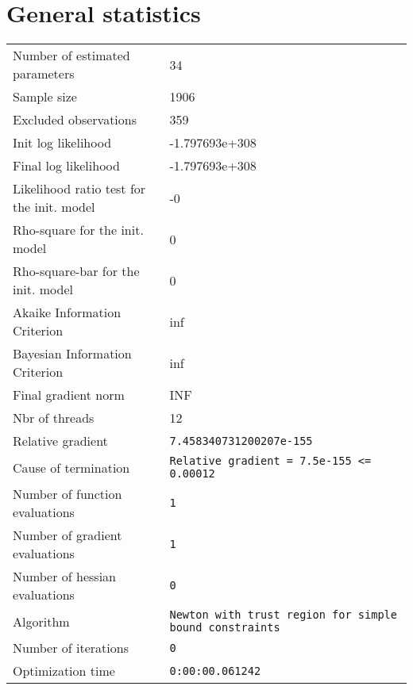



\section{General statistics}
\begin{tabular}{ll}
Number of estimated parameters & 34 \\
Sample size & 1906 \\
Excluded observations & 359 \\
Init log likelihood & -1.797693e+308 \\
Final log likelihood & -1.797693e+308 \\
Likelihood ratio test for the init. model & -0 \\
Rho-square for the init. model & 0 \\
Rho-square-bar for the init. model & 0 \\
Akaike Information Criterion & inf \\
Bayesian Information Criterion & inf \\
Final gradient norm & INF \\
Nbr of threads & 12 \\
Relative gradient & \verb$7.458340731200207e-155$ \\
Cause of termination & \verb$Relative gradient = 7.5e-155 <= 0.00012$ \\
Number of function evaluations & \verb$1$ \\
Number of gradient evaluations & \verb$1$ \\
Number of hessian evaluations & \verb$0$ \\
Algorithm & \verb$Newton with trust region for simple bound constraints$ \\
Number of iterations & \verb$0$ \\
Optimization time & \verb$0:00:00.061242$ \\
\end{tabular}

